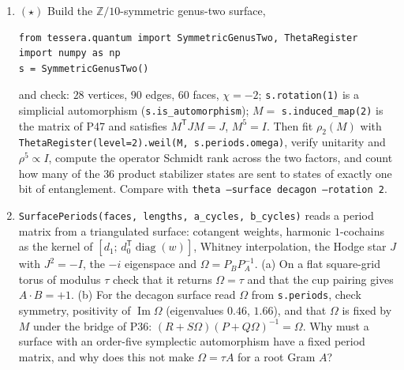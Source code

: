 \documentclass[11pt]{article}
\newcommand{\Z}{\mathbb{Z}}
\begin{document}
\begin{enumerate}[label=\textbf{P\arabic*.},leftmargin=*,start=79]
  of each. (a) Show that the far boundary is a genus-two surface and that
  $\chi(\partial W) = -2$, then use $\chi(W) = \tfrac12\chi(\partial W)$ and
  Mayer--Vietoris to derive the Betti numbers $[1,4,2,0]$ and the restriction
  rank $4 = \tfrac12b_1(\partial W)$. (b) Explain why the monodromy from the two
  near tori to $\Sigma_2$ is block-diagonal (G2) although the period matrix of
  $\Sigma_2$ has $\Omega_{12}\ne0$ (G3). (c) With
\begin{verbatim}
python examples/cobordism/qubit_animation.py theta --tori 4 --join tube
python examples/cobordism/qubit_animation.py theta --tori 4 --join tube \
    --neck-waists 0.25,0.5,1,2,4 --neck-lengths 0.25,0.5,1,2,4
\end{verbatim}
  record $\Omega$, the coherent-state entropy and the trend of $|\Omega_{12}|$
  with the neck, and explain the trend by the plumbing description of a
  degenerating surface.
\item $(\star)$ Build the $\Z/10$-symmetric genus-two surface,
\begin{verbatim}
from tessera.quantum import SymmetricGenusTwo, ThetaRegister
import numpy as np
s = SymmetricGenusTwo()
\end{verbatim}
  and check: $28$ vertices, $90$ edges, $60$ faces, $\chi = -2$; \texttt{s.rotation(1)}
  is a simplicial automorphism (\texttt{s.is\_automorphism}); $M = $ \texttt{s.induced\_map(2)}
  is the matrix of P47 and satisfies $M^{\mathsf T}JM = J$, $M^5 = I$. Then
  fit $\rho_2(M)$ with \texttt{ThetaRegister(level=2).weil(M, s.periods.omega)},
  verify unitarity and $\rho^5\propto I$, compute the operator Schmidt rank
  across the two factors, and count how many of the $36$ product stabilizer
  states are sent to states of exactly one bit of entanglement. Compare with
  \texttt{theta --surface decagon --rotation 2}.
\item \texttt{SurfacePeriods(faces, lengths, a\_cycles, b\_cycles)} reads a period
  matrix from a triangulated surface: cotangent weights, harmonic $1$-cochains
  as the kernel of $[d_1;\,d_0^{\mathsf T}\operatorname{diag}(w)]$, Whitney
  interpolation, the Hodge star $J$ with $J^2 = -I$, the $-i$ eigenspace and
  $\Omega = P_BP_A^{-1}$. (a) On a flat square-grid torus of modulus $\tau$
  check that it returns $\Omega = \tau$ and that the cup pairing gives
  $A\cdot B = +1$. (b) For the decagon surface read $\Omega$ from
  \texttt{s.periods}, check symmetry, positivity of $\operatorname{Im}\Omega$
  (eigenvalues $0.46$, $1.66$), and that $\Omega$ is fixed by $M$ under the
  bridge of P36: $(R+S\Omega)(P+Q\Omega)^{-1} = \Omega$. Why must a
  surface with an order-five symplectic automorphism have a fixed period
  matrix, and why does this not make $\Omega = \tau A$ for a root Gram $A$?
\end{enumerate}
\end{document}
